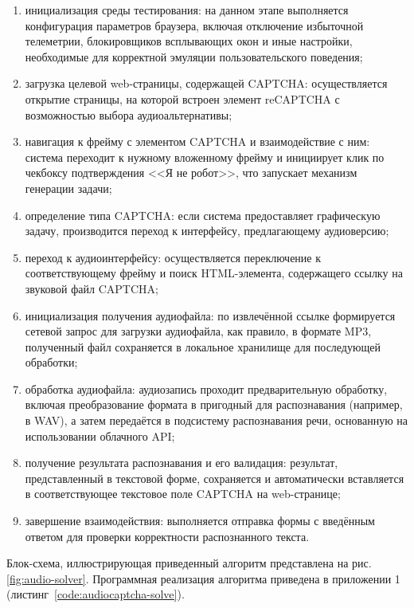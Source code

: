 \begin{enumerate}
    \item инициализация среды тестирования: на данном этапе выполняется 
    конфигурация параметров браузера, включая отключение избыточной телеметрии, 
    блокировщиков всплывающих окон и иные настройки, необходимые для корректной 
    эмуляции пользовательского поведения;
    \item загрузка целевой web-страницы, содержащей CAPTCHA: осуществляется 
    открытие страницы, на которой встроен элемент reCAPTCHA с возможностью выбора 
    аудиоальтернативы;
    \item навигация к фрейму с элементом CAPTCHA и взаимодействие с ним: система 
    переходит к нужному вложенному фрейму и инициирует клик по чекбоксу 
    подтверждения <<Я не робот>>, что запускает механизм генерации задачи;
    \item определение типа CAPTCHA: если система предоставляет графическую 
    задачу, производится переход к интерфейсу, предлагающему аудиоверсию;
    \item переход к аудиоинтерфейсу: осуществляется переключение к 
    соответствующему фрейму и поиск HTML-элемента, содержащего ссылку на звуковой 
    файл CAPTCHA;
    \item инициализация получения аудиофайла: по извлечённой ссылке формируется 
    сетевой запрос для загрузки аудиофайла, как правило, в формате MP3, 
    полученный файл сохраняется в локальное хранилище для последующей обработки;
    \item обработка аудиофайла: аудиозапись проходит предварительную обработку, 
    включая преобразование формата в пригодный для распознавания (например, в 
    WAV), а затем передаётся в подсистему распознавания речи, основанную на 
    использовании облачного API;
    \item получение результата распознавания и его валидация: результат, 
    представленный в текстовой форме, сохраняется и автоматически вставляется в 
    соответствующее текстовое поле CAPTCHA на web-странице;
    \item завершение взаимодействия: выполняется отправка формы с введённым 
    ответом для проверки корректности распознанного текста.
\end{enumerate}

Блок-схема, иллюстрирующая приведенный алгоритм представлена на рис.~
\ref{fig:audio-solver}. Программная реализация алгоритма приведена в приложении 1 
(листинг~\ref{code:audiocaptcha-solve}).

